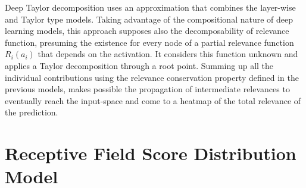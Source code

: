 \documentclass[review]{elsarticle}
\theoremstyle{definition} %
\theoremstyle{remark}
\begin{document}
Deep Taylor decomposition \cite{montavon2017explaining} uses an approximation that combines the layer-wise and Taylor type models. Taking advantage of the compositional nature of deep learning models, this approach supposes also the decomposability of relevance function, presuming the existence for every node of a partial relevance function $R_i(a_i)$ that depends on the activation. It considers this function unknown and applies a Taylor decomposition through a root point. Summing up all the individual contributions using the relevance conservation property defined in the previous models, makes possible the propagation of intermediate relevances to eventually reach the input-space and come to a heatmap of the total relevance of the prediction. 

\section{Receptive Field Score Distribution Model}\label{sec:math}
\end{document}
